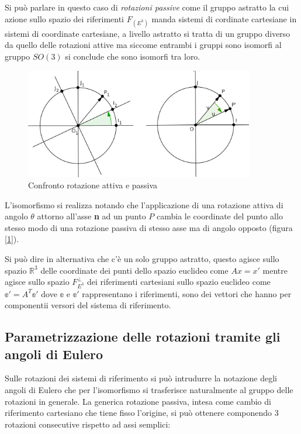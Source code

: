 \documentclass[11pt]{report}
\theoremstyle{plain}
\theoremstyle{definition}
\theoremstyle{remark}
\begin{document}
Si può parlare in questo caso di \emph{rotazioni passive} come il gruppo astratto la cui azione sullo spazio dei riferimenti $F_{(E^{3})}$ manda sistemi di cordinate cartesiane in sistemi di coordinate cartesiane, a livello astratto si tratta di un gruppo diverso da quello delle rotazioni attive ma siccome entrambi i gruppi sono isomorfi al gruppo $SO(3)$ si conclude che sono isomorfi tra loro. 

\begin{figure}[!h]	\label{fig:confrontorotazioni}
\centering
\includegraphics[width=10cm,keepaspectratio]{immagini/Capitolo_III/rotazioniattivepassive}	
\caption{Confronto rotazione attiva e passiva}
\end{figure}

L'isomorfismo si realizza notando che l'applicazione di una rotazione attiva di angolo $\theta$ attorno all'asse \textbf{n} ad un punto $P$ cambia le coordinate del punto allo stesso modo di una rotazione passiva di stesso asse ma di angolo opposto (figura [\ref{fig:confrontorotazioni}]).

Si può dire in alternativa che c'è un solo gruppo astratto, questo agisce sullo spazio $\mathbb{R}^{3}$ delle coordinate dei punti dello spazio euclideo come $A x = x'$ mentre agisce sullo spazio $F_{E^{3}}^{\bot}$ dei riferimenti cartesiani sullo spazio euclideo come $ \mathbb{e'} = A^{T}\mathbb{e'} $ dove $\mathbb{e}$ e $\mathbb{e}'$ rappresentano i riferimenti, sono dei vettori che hanno per componentii versori del sistema di riferimento.

\subsection{Parametrizzazione delle rotazioni tramite gli angoli di Eulero}
Sulle rotazioni dei sistemi di riferimento si può intrudurre la notazione degli angoli di Eulero che per l'isomorfismo si trasferisce naturalmente al gruppo delle rotazioni in generale.
La generica rotazione passiva, intesa come cambio di riferimento cartesiano che tiene fisso l'origine, si può ottenere componendo 3 rotazioni consecutive rispetto ad assi semplici:
\end{document}
